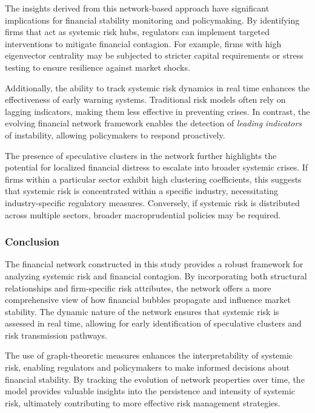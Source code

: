 \documentclass[preprint,12pt,authoryear]{elsarticle}
\begin{document}
The insights derived from this network-based approach have significant implications for financial stability monitoring and policymaking. By identifying firms that act as systemic risk hubs, regulators can implement targeted interventions to mitigate financial contagion. For example, firms with high eigenvector centrality may be subjected to stricter capital requirements or stress testing to ensure resilience against market shocks.

Additionally, the ability to track systemic risk dynamics in real time enhances the effectiveness of early warning systems. Traditional risk models often rely on lagging indicators, making them less effective in preventing crises. In contrast, the evolving financial network framework enables the detection of \textit{leading indicators} of instability, allowing policymakers to respond proactively.

The presence of speculative clusters in the network further highlights the potential for localized financial distress to escalate into broader systemic crises. If firms within a particular sector exhibit high clustering coefficients, this suggests that systemic risk is concentrated within a specific industry, necessitating industry-specific regulatory measures. Conversely, if systemic risk is distributed across multiple sectors, broader macroprudential policies may be required.

\subsubsection{Conclusion}  

The financial network constructed in this study provides a robust framework for analyzing systemic risk and financial contagion. By incorporating both structural relationships and firm-specific risk attributes, the network offers a more comprehensive view of how financial bubbles propagate and influence market stability. The dynamic nature of the network ensures that systemic risk is assessed in real time, allowing for early identification of speculative clusters and risk transmission pathways.

The use of graph-theoretic measures enhances the interpretability of systemic risk, enabling regulators and policymakers to make informed decisions about financial stability. By tracking the evolution of network properties over time, the model provides valuable insights into the persistence and intensity of systemic risk, ultimately contributing to more effective risk management strategies.
\end{document}
